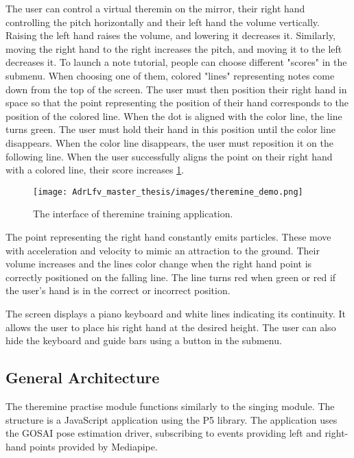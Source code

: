 The user can control a virtual theremin on the mirror, their right hand controlling the pitch horizontally and their left hand the volume vertically. Raising the left hand raises the volume, and lowering it decreases it. Similarly, moving the right hand to the right increases the pitch, and moving it to the left decreases it. 
To launch a note tutorial, people can choose different "scores" in the submenu. When choosing one of them, colored "lines" representing notes come down from the top of the screen.
The user must then position their right hand in space so that the point representing the position of their hand corresponds to the position of the colored line. When the dot is aligned with the color line, the line turns green. The user must hold their hand in this position until the color line disappears. When the color line disappears, the user must reposition it on the following line. When the user successfully aligns the point on their right hand with a colored line, their score increases \ref{fig:theremine_demo}.

\begin{figure}[h]
    \centering
    \texttt{[image: AdrLfv\_master\_thesis/images/theremine\_demo.png]}
    \caption{The interface of theremine training application.}
    \label{fig:theremine_demo}
\end{figure}

The point representing the right hand constantly emits particles. These move with acceleration and velocity to mimic an attraction to the ground. Their volume increases and the lines color change when the right hand point is correctly positioned on the falling line. The line turns red when green or red if the user's hand is in the correct or incorrect position.

The screen displays a piano keyboard and white lines indicating its continuity. It allows the user to place his right hand at the desired height. The user can also hide the keyboard and guide bars using a button in the submenu.

\subsection{General Architecture}

The theremine practise module functions similarly to the singing module. The structure is a JavaScript application using the P5 library. The application uses the GOSAI pose estimation driver, subscribing to events providing left and right-hand points provided by Mediapipe.

